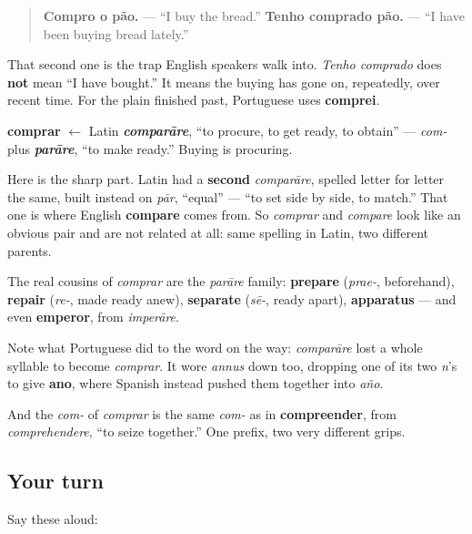 \begin{quote}
\textbf{Compro o pão.} — \textquotedblleft{}I buy the bread.\textquotedblright{} \textbf{Tenho comprado pão.} — \textquotedblleft{}I have been buying bread lately.\textquotedblright{}
\end{quote}

That second one is the trap English speakers walk into. \emph{Tenho comprado} does \textbf{not} mean \textquotedblleft{}I have bought.\textquotedblright{} It means the buying has gone on, repeatedly, over recent time. For the plain finished past, Portuguese uses \textbf{comprei}.

\begin{cousinweb}
\textbf{comprar} $\leftarrow$ Latin \emph{\textbf{comparāre}}, \textquotedblleft{}to procure, to get ready, to obtain\textquotedblright{} — \emph{com-} plus \emph{\textbf{parāre}}, \textquotedblleft{}to make ready.\textquotedblright{} Buying is procuring.

Here is the sharp part. Latin had a \textbf{second} \emph{comparāre}, spelled letter for letter the same, built instead on \emph{pār}, \textquotedblleft{}equal\textquotedblright{} — \textquotedblleft{}to set side by side, to match.\textquotedblright{} That one is where English \textbf{compare} comes from. So \emph{comprar} and \emph{compare} look like an obvious pair and are not related at all: same spelling in Latin, two different parents.

The real cousins of \emph{comprar} are the \emph{parāre} family: \textbf{prepare} (\emph{prae-}, beforehand), \textbf{repair} (\emph{re-}, made ready anew), \textbf{separate} (\emph{sē-}, ready apart), \textbf{apparatus} — and even \textbf{emperor}, from \emph{imperāre}.

Note what Portuguese did to the word on the way: \emph{comparāre} lost a whole syllable to become \emph{comprar}. It wore \emph{annus} down too, dropping one of its two \emph{n}'s to give \textbf{ano}, where Spanish instead pushed them together into \emph{año}.

And the \emph{com-} of \emph{comprar} is the same \emph{com-} as in \textbf{compreender}, from \emph{comprehendere}, \textquotedblleft{}to seize together.\textquotedblright{} One prefix, two very different grips.
\end{cousinweb}

\subsection*{Your turn}
Say these aloud:


